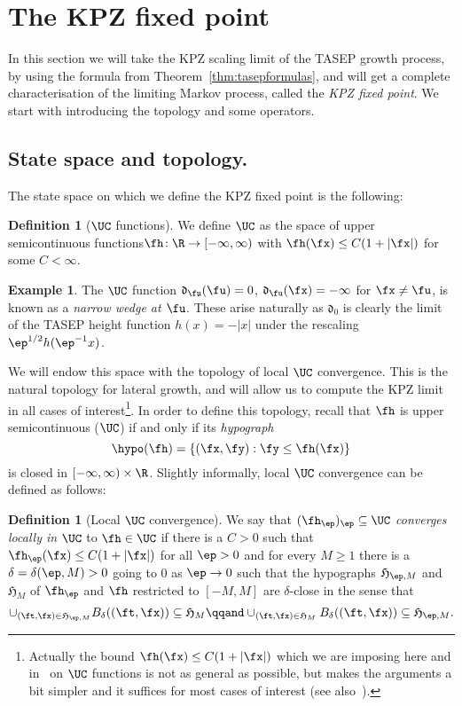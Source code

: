 \documentclass[]{pcmi}
\theoremstyle{plain}
\theoremstyle{definition}
\newtheorem{definition}[equation]{Definition}
\newtheorem{example}[equation]{Example}
\begin{document}
\section{The KPZ fixed point}\label{sec:123}

In this section we will take the KPZ scaling limit of the TASEP growth process, by using the formula from Theorem~\ref{thm:tasepformulas}, and will get a complete characterisation of the limiting Markov process, called the \emph{KPZ fixed point}. We start with introducing the topology and some operators.

\subsection{State space and topology.}
\label{UC} 

The state space on which we define the KPZ fixed point is the following:

\begin{definition}[$\UC$ functions]
We define $\UC$ as the space of upper semicontinuous functions\break$\fh\!:\R \to [-\infty,\infty)$ with $\fh(\fx)\le C(1+|\fx|)$  for some $C<\infty$.
\end{definition}

\begin{example}
The $\UC$ function $\mathfrak{d}_\fu(\fu) = 0$, $\mathfrak{d}_\fu(\fx) = -\infty$ for $\fx\neq \fu$, is known as a \emph{narrow wedge at $\fu$}.
These arise naturally as $\mathfrak{d}_0$ is clearly the limit  of the TASEP height function $h(x)=-|x|$ under the rescaling $\ep^{1/2}h(\ep^{-1}x)$.
\end{example}

We will endow this space with the topology of local $\UC$ convergence.
This is the natural topology for lateral growth, and will allow us to compute the KPZ limit in all cases of interest\footnote{Actually the bound $\fh(\fx)\le C(1+|\fx|)$ which we are imposing here and in~\cite{fixedpt} on $\UC$ functions is not as general as possible, but makes the arguments a bit simpler and it suffices for most cases of interest (see also~\cite[Foot. 9]{fixedpt}).}.
In order to define this topology, recall that $\fh$ is upper semicontinuous ($\UC$) if and only if its \emph{hypograph} 
\[\hypo(\fh) = \{(\fx,\fy): \fy\le \fh(\fx)\}\]
is closed in $[-\infty,\infty)\times \R$.
Slightly informally, local $\UC$ convergence can be defined as follows:

\begin{definition}[Local $\UC$ convergence]
We say that $(\fh_\ep)_\ep\subseteq\UC$ \emph{converges locally in $\UC$} to $\fh\in\UC$ if there is a $C>0$ such that $\fh_\ep(\fx) \le C(1+|\fx|)$ for all $\ep>0$ and for every $M\geq1$ there is a $\delta=\delta(\ep,M)>0$ going to 0 as $\ep\to0$ such that the hypographs $\mathfrak{H}_{\ep,M}$ and $\mathfrak{H}_{M}$ of $\fh_\ep$ and $\fh$ restricted to $[-M,M]$ are $\delta$-close in the sense that 
\[\cup_{(\ft,\fx)\in\mathfrak{H}_{\ep,M}}B_{\delta}((\ft,\fx))\subseteq\mathfrak{H}_{M}\qqand\cup_{(\ft,\fx)\in\mathfrak{H}_{M}}B_{\delta}((\ft,\fx))\subseteq\mathfrak{H}_{\ep,M}.\]
\end{definition}
\end{document}
